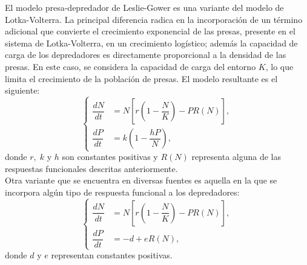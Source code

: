 El modelo presa-depredador de Leslie-Gower es una variante del modelo de Lotka-Volterra. La principal diferencia radica en la incorporación de un término adicional que convierte el crecimiento exponencial de las presas, presente en el sistema de Lotka-Volterra, en un crecimiento logístico; además la capacidad de carga de los depredadores es directamente proporcional a la densidad de las presas. En este caso, se considera la capacidad de carga del entorno $K$, lo que limita el crecimiento de la población de presas. El modelo resultante es el siguiente:
\begin{equation}
	\left\{
	\begin{aligned}
		\dfrac{dN}{dt} &= N\left[r\left(1-\dfrac{N}{K}\right)-PR(N)\right], \\
		\dfrac{dP}{dt} &= k\left( 1 - \dfrac{hP}{N} \right),
	\end{aligned}
	\right.
	\label{eq: leslie}
\end{equation}
donde $r, \; k$ y $h$ son constantes positivas y $R(N)$ representa alguna de las respuestas funcionales descritas anteriormente. \\

Otra variante que se encuentra en diversas fuentes es aquella en la que se incorpora algún tipo de respuesta funcional a los depredadores:
\begin{equation}
	\left\{
	\begin{aligned}
		\dfrac{dN}{dt} &= N\left[r\left(1-\dfrac{N}{K}\right)-PR(N)\right], \\
		\dfrac{dP}{dt} &= -d+eR(N),
	\end{aligned}
	\right.
	\label{eq: leslie-gower}
\end{equation}
donde $d$ y $e$ representan constantes positivas.